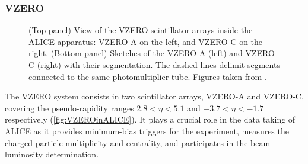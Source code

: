 \subsubsection{VZERO}
\label{subsubsec:VZERO}

\begin{figure}[t]
\centering
{}	
	\caption{(Top panel) View of the VZERO scintillator arrays inside the ALICE apparatus: VZERO-A on the left, and VZERO-C on the right. (Bottom panel) Sketches of the VZERO-A (left) and VZERO-C (right) with their segmentation. The dashed lines delimit segments connected to the same photomultiplier tube. Figures taken from \cite{alicecollaborationALICEExperimentJourney2022}\cite{alicecollaborationPerformanceALICEVZERO2013}.}
	\label{fig:VZEROdetector}
\end{figure}

The VZERO system consists in two scintillator arrays, VZERO-A and VZERO-C, covering the pseudo-rapidity ranges $2.8 < \eta < 5.1$ and $-3.7 < \eta < -1.7$ respectively (\fig\ref{fig:VZEROinALICE}). It plays a crucial role in the data taking of ALICE as it provides minimum-bias triggers for the experiment, measures the charged particle multiplicity and centrality, and participates in the beam luminosity determination.


